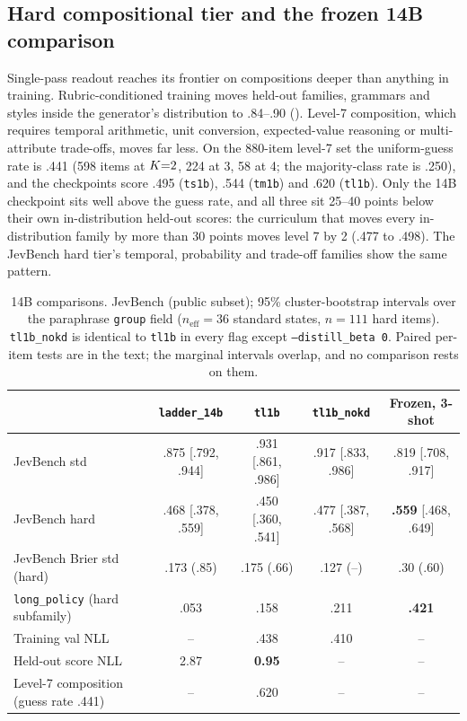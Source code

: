 \subsection{Hard compositional tier and the frozen 14B comparison}
\label{app:hard-tier}

Single-pass readout reaches its frontier on compositions deeper than anything in training.
Rubric-conditioned training moves held-out families, grammars and styles inside the generator's distribution to .84--.90
(). Level-7 composition, which requires temporal arithmetic, unit conversion,
expected-value reasoning or multi-attribute trade-offs, moves far less. On the 880-item level-7 set the
uniform-guess rate is .441 (598 items at $K{=}2$, 224 at 3, 58 at 4; the majority-class rate is
.250), and the checkpoints score .495 (\texttt{ts1b}), .544 (\texttt{tm1b}) and .620 (\texttt{tl1b}).
Only the 14B checkpoint sits well above the guess rate, and all three sit 25--40 points below their
own in-distribution held-out scores: the curriculum that moves every in-distribution family by more than
30 points moves level 7 by 2 (.477 to .498). The JevBench hard tier's temporal, probability and trade-off families
show the same pattern.

\begin{table}[h]
  \centering
  \caption{14B comparisons. JevBench (public subset); 95\% cluster-bootstrap
  intervals over the paraphrase \texttt{group} field ($n_{\mathrm{eff}}{=}36$ standard states,
  $n{=}111$ hard items). \texttt{tl1b\_nokd} is identical to \texttt{tl1b} in every flag except
  \texttt{--distill\_beta 0}. Paired per-item tests are in the text; the marginal intervals overlap, and
  no comparison rests on them.}
  \label{tab:tl1b}
  \small
  \setlength{\tabcolsep}{2pt}
  \begin{tabular}{lcccc}
    \toprule
    & \texttt{ladder\_14b} & \texttt{tl1b} & \texttt{tl1b\_nokd} & Frozen, 3-shot \\
    \midrule
    JevBench std & .875 [.792, .944] & .931 [.861, .986] & .917 [.833, .986] & .819 [.708, .917] \\
    JevBench hard & .468 [.378, .559] & .450 [.360, .541] & .477 [.387, .568] & \textbf{.559} [.468, .649] \\
    JevBench Brier std (hard) & .173 (.85) & .175 (.66) & .127 (--) & .30 (.60) \\
    \texttt{long\_policy} (hard subfamily) & .053 & .158 & .211 & \textbf{.421} \\
    Training val NLL & -- & .438 & .410 & -- \\
    Held-out score NLL & 2.87 & \textbf{0.95} & -- & -- \\
    Level-7 composition (guess rate .441) & -- & .620 & -- & -- \\
    \bottomrule
  \end{tabular}
\end{table}


